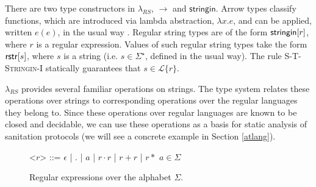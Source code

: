 \documentclass[9pt]{sig-alternate}
\newcommand{\todo}[1]{{\color{red} #1}}
\theoremstyle{definition}
\newcommand{\Lagr}{\mathcal{L}}
\newcommand{\lang}[1]{\Lagr\{#1\}}
\newcommand{\lambdas}{\lambda_{RS}}
\newcommand{\sistr}[1]{{\sf rstr}[#1]}   \newcommand{\rstr}[1]{{\sf rstr}[#1]} %
\newcommand{\strin}[1]{\sistr{#1}}
\newcommand{\stringin}[1]{{\sf stringin}[#1]}
\begin{document}
There are two type constructors in $\lambdas$, $\rightarrow$ and $\textsf{stringin}$. Arrow types classify functions, which are introduced via lambda abstraction, $\lambda x.e$, and can be applied, written $e(e)$, in the usual way \cite{pfpl}. Regular string types are of the form $\stringin{r}$, where $r$ is a regular expression. Values of such regular string types take the form $\strin{s}$, where $s$ is a string (i.e. $s \in \Sigma^\star$, defined in the usual way). The rule \textsc{S-T-Stringin-I} statically guarantees that $s \in \lang{r}$.


$\lambdas$ provides several familiar operations on strings. The type system  relates these operations over strings to corresponding operations over the  regular languages they belong to. 
Since these operations over regular languages are known to be closed and decidable, we can use these operations as a basis for static analysis of sanitation protocols (we will see a concrete example in Section \ref{atlang}).





\renewcommand{\grammarlabel}[2]{#1\hfill#2}
\begin{figure}[h]
\begin{grammar}
<$r$> ::= $\epsilon$ | $.$ | $a$ | $r \cdot r$ | $r + r$ | $r*$ \hfill $a \in \Sigma$

\caption{Regular expressions over the alphabet $\Sigma$.}
\label{fig:regex}
\end{grammar}
\end{figure}
\end{document}
